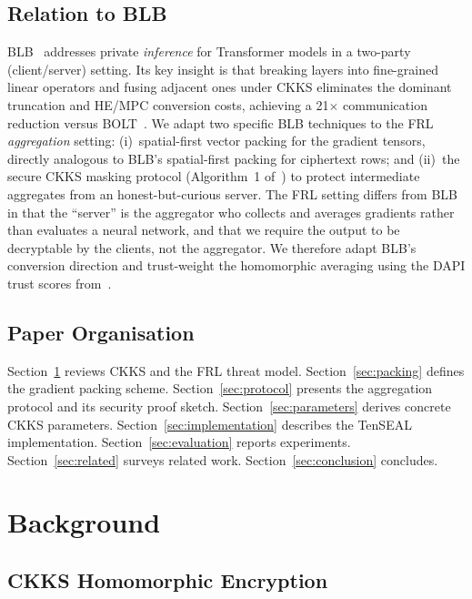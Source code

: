\documentclass[letterpaper,journal]{IEEEtran}
\begin{document}
\subsection*{Relation to BLB}

BLB~\cite{blb2025} addresses private \emph{inference} for Transformer models in
a two-party (client/server) setting.
Its key insight is that breaking layers into fine-grained linear operators
and fusing adjacent ones under CKKS eliminates the dominant truncation and
HE/MPC conversion costs, achieving a 21$\times$ communication reduction versus
BOLT~\cite{bolt2024}.
We adapt two specific BLB techniques to the FRL \emph{aggregation} setting:
(i)~spatial-first vector packing for the gradient tensors, directly analogous
to BLB's spatial-first packing for ciphertext rows; and
(ii)~the secure CKKS masking protocol (Algorithm~1 of~\cite{blb2025}) to
protect intermediate aggregates from an honest-but-curious server.
The FRL setting differs from BLB in that the ``server'' is the aggregator
who collects and averages gradients rather than evaluates a neural network, and
that we require the output to be decryptable by the clients, not the aggregator.
We therefore adapt BLB's conversion direction and trust-weight the homomorphic
averaging using the DAPI trust scores from~\cite{frlconf2026}.

\subsection*{Paper Organisation}

Section~\ref{sec:background} reviews CKKS and the FRL threat model.
Section~\ref{sec:packing} defines the gradient packing scheme.
Section~\ref{sec:protocol} presents the aggregation protocol and its security
proof sketch.
Section~\ref{sec:parameters} derives concrete CKKS parameters.
Section~\ref{sec:implementation} describes the TenSEAL implementation.
Section~\ref{sec:evaluation} reports experiments.
Section~\ref{sec:related} surveys related work.
Section~\ref{sec:conclusion} concludes.

\section{Background}\label{sec:background}

\subsection{CKKS Homomorphic Encryption}
\end{document}
